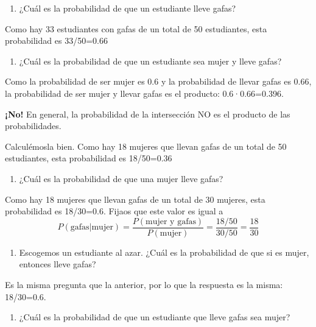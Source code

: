 \documentclass[
]{book}
\providecommand{\tightlist}{%
  \setlength{\itemsep}{0pt}\setlength{\parskip}{0pt}}
\theoremstyle{definition}
\theoremstyle{definition}
\theoremstyle{definition}
\theoremstyle{definition}
\theoremstyle{remark}
\begin{document}
\begin{enumerate}
\def\labelenumi{\arabic{enumi}.}
\setcounter{enumi}{1}
\tightlist
\item
  ¿Cuál es la probabilidad de que un estudiante lleve gafas?
\end{enumerate}

Como hay 33 estudiantes con gafas de un total de 50 estudiantes, esta probabilidad es 33/50=0.66

\begin{enumerate}
\def\labelenumi{\arabic{enumi}.}
\setcounter{enumi}{2}
\tightlist
\item
  ¿Cuál es la probabilidad de que un estudiante sea mujer y lleve gafas?
\end{enumerate}

Como la probabilidad de ser mujer es 0.6 y la probabilidad de llevar gafas es 0.66, la probabilidad de ser mujer y llevar gafas es el producto: 0.6·0.66=0.396.

\begin{rmderror}
\textbf{¡No!} En general, la probabilidad de la intersección NO es el producto de las probabilidades.
\end{rmderror}

Calculémosla bien. Como hay 18 mujeres que llevan gafas de un total de 50 estudiantes, esta probabilidad es 18/50=0.36

\begin{enumerate}
\def\labelenumi{\arabic{enumi}.}
\setcounter{enumi}{3}
\tightlist
\item
  ¿Cuál es la probabilidad de que una mujer lleve gafas?
\end{enumerate}

Como hay 18 mujeres que llevan gafas de un total de 30 mujeres, esta probabilidad es 18/30=0.6. Fijaos que este valor es igual a
\[
P(\text{gafas}|\text{mujer})=\frac{P(\text{mujer y gafas})}{P(\text{mujer})}=\frac{18/50}{30/50}=\frac{18}{30}
\]

\begin{enumerate}
\def\labelenumi{\arabic{enumi}.}
\setcounter{enumi}{4}
\tightlist
\item
  Escogemos un estudiante al azar. ¿Cuál es la probabilidad de que si es mujer, entonces lleve gafas?
\end{enumerate}

Es la misma pregunta que la anterior, por lo que la respuesta es la misma: 18/30=0.6.

\begin{enumerate}
\def\labelenumi{\arabic{enumi}.}
\setcounter{enumi}{5}
\tightlist
\item
  ¿Cuál es la probabilidad de que un estudiante que lleve gafas sea mujer?
\end{enumerate}
\end{document}
